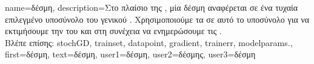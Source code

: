 {name={\foreignlanguage{greek}{δέσμη}},
	description={\foreignlanguage{greek}{Στο πλαίσιο της} 
		, \foreignlanguage{greek}{μία δέσμη αναφέρεται σε ένα τυχαία επιλεγμένο υποσύνολο 
		του γενικού} . \foreignlanguage{greek}{Χρησιμοποιούμε τα}  
		\foreignlanguage{greek}{σε αυτό το υποσύνολο για να εκτιμήσουμε την} 
		 \foreignlanguage{greek}{του}  \foreignlanguage{greek}{και στη συνέχεια 
		να ενημερώσουμε τις} .\\
		\foreignlanguage{greek}{Βλέπε επίσης:} \gls{stochGD}, \gls{trainset}, \gls{datapoint}, \gls{gradient}, \gls{trainerr}, \glspl{modelparam}.}, 
	first={\foreignlanguage{greek}{δέσμη}},
	text={\foreignlanguage{greek}{δέσμη}},
	user1={\foreignlanguage{greek}{δέσμη}}, %
    	user2={\foreignlanguage{greek}{δέσμης}}, %
	user3={\foreignlanguage{greek}{δέσμη}} %
}

